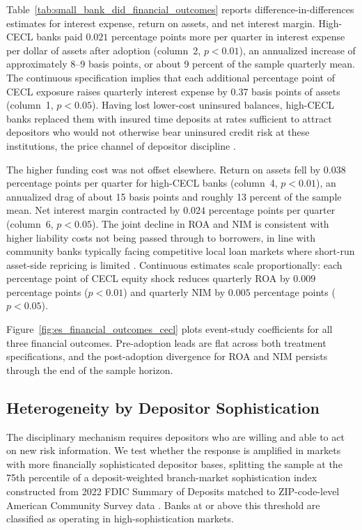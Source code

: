 Table~\ref{tab:small_bank_did_financial_outcomes} reports difference-in-differences
estimates for interest expense, return on assets, and net interest margin.
High-CECL banks paid $0.021$ percentage points more per quarter in interest
expense per dollar of assets after adoption (column~2, $p < 0.01$), an
annualized increase of approximately 8--9 basis points, or about 9 percent of
the sample quarterly mean.  The continuous specification implies that each
additional percentage point of CECL exposure raises quarterly interest expense
by 0.37 basis points of assets (column~1, $p < 0.05$).  Having lost lower-cost
uninsured balances, high-CECL banks replaced them with insured time deposits at
rates sufficient to attract depositors who would not otherwise bear uninsured
credit risk at these institutions, the price channel of depositor discipline
\citep{nier2006market, billett1998cost}.

The higher funding cost was not offset elsewhere.  Return on assets fell by
$0.038$ percentage points per quarter for high-CECL banks (column~4, $p < 0.01$),
an annualized drag of about 15 basis points and roughly 13 percent of the sample
mean.  Net interest margin contracted by $0.024$ percentage points per quarter
(column~6, $p < 0.05$).  The joint decline in ROA and NIM is consistent with
higher liability costs not being passed through to borrowers, in line with
community banks typically facing competitive local loan markets where
short-run asset-side repricing is limited \citep{hannan1988bank}.
Continuous estimates scale proportionally: each percentage point of CECL equity
shock reduces quarterly ROA by $0.009$ percentage points ($p < 0.01$) and
quarterly NIM by $0.005$ percentage points ($p < 0.05$).

Figure~\ref{fig:es_financial_outcomes_cecl} plots event-study coefficients for
all three financial outcomes.  Pre-adoption leads are flat across both treatment
specifications, and the post-adoption divergence for ROA and NIM persists through
the end of the sample horizon.

\subsection{Heterogeneity by Depositor Sophistication}
\label{sec:results:sophistication}
\label{sec:results:heterogeneity}

The disciplinary mechanism requires depositors who are willing and able to act
on new risk information.  We test whether the response is amplified in markets
with more financially sophisticated depositor bases, splitting the sample at the
75th percentile of a deposit-weighted branch-market sophistication index
constructed from 2022 FDIC Summary of Deposits matched to ZIP-code-level
American Community Survey data \citep{ACS2022}.  Banks at or above this threshold
are classified as operating in high-sophistication markets.


